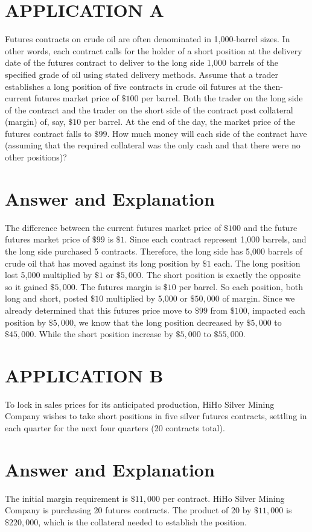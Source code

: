 \documentclass[11pt]{article}
\begin{document}
\section*{APPLICATION A}
Futures contracts on crude oil are often denominated in 1,000-barrel sizes. In other words, each contract calls for the holder of a short position at the delivery date of the futures contract to deliver to the long side 1,000 barrels of the specified grade of oil using stated delivery methods. Assume that a trader establishes a long position of five contracts in crude oil futures at the then-current futures market price of $\$ 100$ per barrel. Both the trader on the long side of the contract and the trader on the short side of the contract post collateral (margin) of, say, $\$ 10$ per barrel. At the end of the day, the market price of the futures contract falls to $\$ 99$. How much money will each side of the contract have (assuming that the required collateral was the only cash and that there were no other positions)?

\section*{Answer and Explanation}
The difference between the current futures market price of $\$ 100$ and the future futures market price of $\$ 99$ is $\$ 1$. Since each contract represent 1,000 barrels, and the long side purchased 5 contracts. Therefore, the long side has 5,000 barrels of crude oil that has moved against its long position by $\$ 1$ each. The long position lost 5,000 multiplied by $\$ 1$ or $\$ 5,000$. The short position is exactly the opposite so it gained $\$ 5,000$. The futures margin is $\$ 10$ per barrel. So each position, both long and short, posted $\$ 10$ multiplied by 5,000 or $\$ 50,000$ of margin. Since we already determined that this futures price move to $\$ 99$ from $\$ 100$, impacted each position by $\$ 5,000$, we know that the long position decreased by $\$ 5,000$ to $\$ 45,000$. While the short position increase by $\$ 5,000$ to $\$ 55,000$.

\section*{APPLICATION B}
To lock in sales prices for its anticipated production, HiHo Silver Mining Company wishes to take short positions in five silver futures contracts, settling in each quarter for the next four quarters (20 contracts total).

\section*{Answer and Explanation}
The initial margin requirement is $\$ 11,000$ per contract. HiHo Silver Mining Company is purchasing 20 futures contracts. The product of 20 by $\$ 11,000$ is $\$ 220,000$, which is the collateral needed to establish the position.
\end{document}
